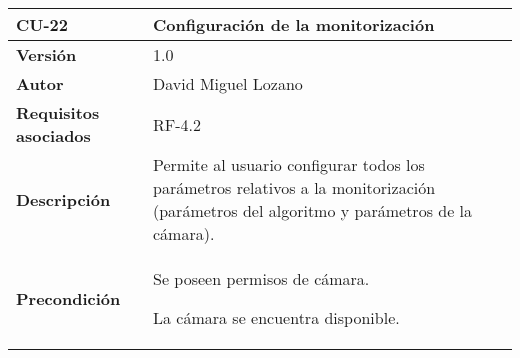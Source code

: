 \begin{longtable}[H]{@{}ll@{}}
\toprule
\begin{minipage}[b]{0.26\columnwidth}\raggedright\strut
\textbf{CU-22}\strut
\end{minipage} & \begin{minipage}[b]{0.68\columnwidth}\raggedright\strut
\textbf{Configuración de la monitorización}\strut
\end{minipage}\tabularnewline
\midrule
\endhead
\begin{minipage}[t]{0.26\columnwidth}\raggedright\strut
\textbf{Versión}\strut
\end{minipage} & \begin{minipage}[t]{0.68\columnwidth}\raggedright\strut
1.0\strut
\end{minipage}\tabularnewline
\begin{minipage}[t]{0.26\columnwidth}\raggedright\strut
\textbf{Autor}\strut
\end{minipage} & \begin{minipage}[t]{0.68\columnwidth}\raggedright\strut
David Miguel Lozano\strut
\end{minipage}\tabularnewline
\begin{minipage}[t]{0.26\columnwidth}\raggedright\strut
\textbf{Requisitos asociados}\strut
\end{minipage} & \begin{minipage}[t]{0.68\columnwidth}\raggedright\strut
RF-4.2\strut
\end{minipage}\tabularnewline
\begin{minipage}[t]{0.26\columnwidth}\raggedright\strut
\textbf{Descripción}\strut
\end{minipage} & \begin{minipage}[t]{0.68\columnwidth}\raggedright\strut
Permite al usuario configurar todos los parámetros relativos a la
monitorización (parámetros del algoritmo y parámetros de la
cámara).\strut
\end{minipage}\tabularnewline
\begin{minipage}[t]{0.26\columnwidth}\raggedright\strut
\textbf{Precondición}\strut
\end{minipage} & \begin{minipage}[t]{0.68\columnwidth}\raggedright\strut
Se poseen permisos de cámara.

La cámara se encuentra disponible.


\end{minipage}
\end{longtable}
